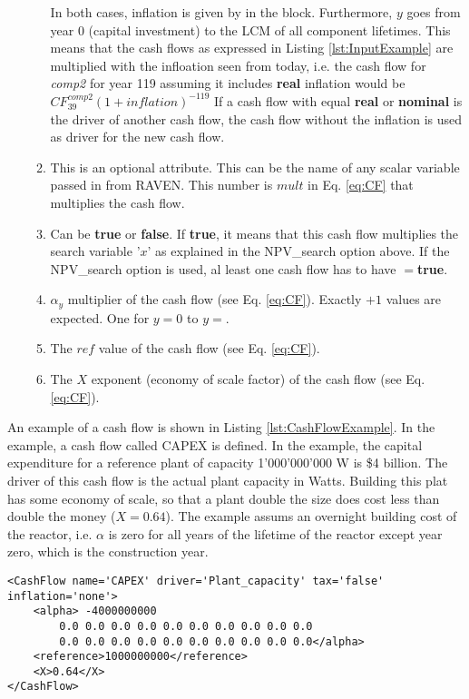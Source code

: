 \begin{enumerate}
\begin{enumerate}
In both cases, inflation is given by  in the  block. Furthermore, $y$ goes from year 0 (capital investment) to the LCM of all component lifetimes.
This means that the cash flows as expressed in Listing \ref{lst:InputExample} are multiplied with the infloation seen from today, i.e. the cash flow for \textit{comp2} for year 119 assuming it includes \textbf{real}
inflation would be $CF^{comp2}_{39}(1+inflation)^{-119}$
 If a cash flow with  equal \textbf{real} or \textbf{nominal} is the driver of another cash flow, the cash flow without the inflation is used as driver for the new cash flow.
  \item[\xmlAttr{multiply}] This is an optional attribute. This can be the name of any scalar variable passed in from RAVEN. This number is $mult$ in Eq. \ref{eq:CF} that multiplies the cash flow.
  \item[\xmlAttr{mult\_target}] Can be \textbf{true} or \textbf{false}. If \textbf{true}, it means that this cash flow multiplies the search variable '$x$' as explained in the NPV\_search option above.
 If the NPV\_search option is used, al least one cash flow has to have $=$\textbf{true}.
  \item[\xmlNode{alpha}] $\alpha_{y}$ multiplier of the cash flow (see Eq. \ref{eq:CF}). Exactly $ + 1$ values are expected. One for $y=0$ to $y=$.
  \item[\xmlNode{reference}] The $ref$ value of the cash flow (see Eq. \ref{eq:CF}).
  \item[\xmlNode{X}] The $X$ exponent (economy of scale factor) of the cash flow (see Eq. \ref{eq:CF}).

  \end{enumerate}
\end{enumerate}

An example of a cash flow is shown in Listing \ref{lst:CashFlowExample}. In the example, a cash flow called CAPEX is defined. In the example, the capital expenditure for a reference plant of capacity
 1'000'000'000 W is \$4 billion. The driver of this cash flow is the actual plant capacity in Watts. Building this plat has some economy of scale, so that a plant double the size does cost 
less than double the money ($X=0.64$). The example assums an overnight building cost of the reactor, i.e. $\alpha$ is zero for all years of the lifetime of the reactor except year zero, which is the construction year.

\begin{lstlisting}[style=XML,morekeywords={anAttribute},caption=CashFlow input example., label=lst:CashFlowExample]
<CashFlow name='CAPEX' driver='Plant_capacity' tax='false' inflation='none'>
    <alpha> -4000000000
        0.0 0.0 0.0 0.0 0.0 0.0 0.0 0.0 0.0 0.0
        0.0 0.0 0.0 0.0 0.0 0.0 0.0 0.0 0.0 0.0</alpha>
    <reference>1000000000</reference>
    <X>0.64</X>
</CashFlow>
\end{lstlisting}



